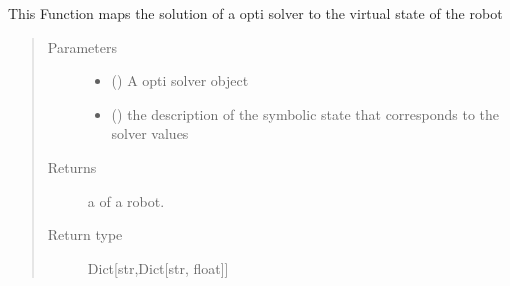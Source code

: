 \documentclass[letterpaper,10pt,english]{sphinxmanual}
\begin{document}
\begin{fulllineitems}
\begin{fulllineitems}
\begin{quote}
\begin{description}
\end{description}\end{quote}

\end{fulllineitems}


\begin{fulllineitems}
\label{\detokenize{code_docu:trip_kinematics.Robot.Robot.solver_to_virtual_state}}
This Function maps the solution of a opti solver to the virtual state of the robot
\begin{quote}\begin{description}
\item[{Parameters}] \leavevmode\begin{itemize}
\item {} 
 (\sphinxstyleliteralemphasis{\sphinxupquote{{[}}}\sphinxstyleliteralemphasis{\sphinxupquote{{]}}}) \textendash{} A opti solver object

\item {} 
 (\sphinxstyleliteralemphasis{\sphinxupquote{{[}}}\sphinxstyleliteralemphasis{\sphinxupquote{{]}}}) \textendash{} the description of the symbolic state that corresponds to the solver values

\end{itemize}

\item[{Returns}] \leavevmode
a  of a robot.

\item[{Return type}] \leavevmode
Dict{[}str,Dict{[}str, float{]}{]}

\end{description}\end{quote}

\end{fulllineitems}


\end{fulllineitems}
\end{document}

